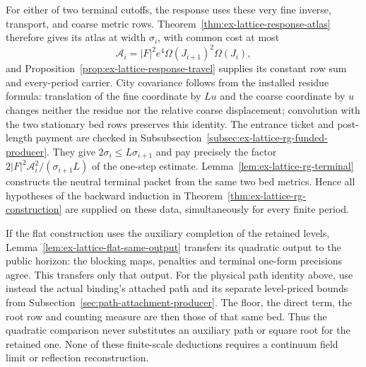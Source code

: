 For either of two terminal cutoffs, the response uses these very fine
inverse, transport, and coarse metric rows. Theorem~\ref{thm:ex-lattice-response-atlas}
therefore gives its atlas at width $\sigma_i$, with common cost at most
\[
 \mathcal A_i=|F|^2e^4\Omega(J_{i+1})^2\Omega(J_i),
\]
and Proposition~\ref{prop:ex-lattice-response-travel} supplies its
constant row sum and every-period carrier. City covariance follows
from the installed residue formula: translation of the fine coordinate
by $Lu$ and the coarse coordinate by $u$ changes neither the residue
nor the relative coarse displacement; convolution with the two stationary
bed rows preserves this identity.
The entrance ticket and post-length payment are checked in
Subsubsection~\ref{subsec:ex-lattice-rg-funded-producer}. They give
$2\sigma_i\le L\sigma_{i+1}$ and pay precisely the factor
$2|F|^2\mathcal A_i^2/(\sigma_{i+1}L)$ of the one-step estimate.
Lemma~\ref{lem:ex-lattice-rg-terminal} constructs the neutral terminal
packet from the same two bed metrics. Hence all hypotheses of the
backward induction in Theorem~\ref{thm:ex-lattice-rg-construction}
are supplied on these data, simultaneously for every finite period.

If the flat construction uses the auxiliary completion of the retained
levels, Lemma~\ref{lem:ex-lattice-flat-same-output} transfers its quadratic
output to the public horizon: the blocking maps, penalties and terminal
one-form precisions agree. This transfers only that output. For the
physical path identity above, use instead the actual binding's attached
path and its separate level-priced bounds from
Subsection~\ref{sec:path-attachment-producer}. The floor, the direct term,
the root row and counting measure are then those of that same bed.
Thus the quadratic comparison never substitutes an auxiliary path or
square root for the retained one. None of these finite-scale deductions
requires a continuum field limit or reflection reconstruction.
